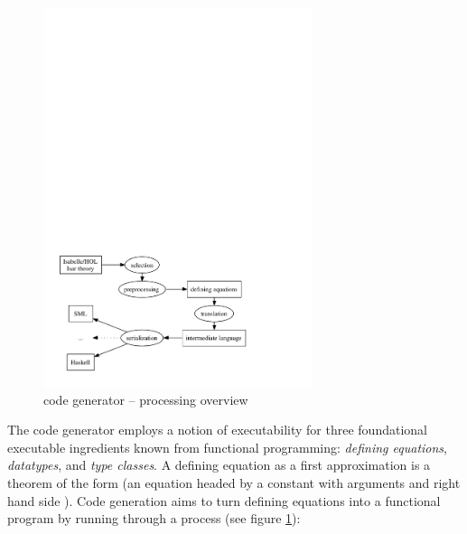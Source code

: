 \begin{isabellebody}
\begin{isamarkuptext}
\end{isamarkuptext}%
\isamarkuptrue%
%
\isamarkuptrue%
%
\begin{isamarkuptext}%
\begin{figure}[h]
  \centering
  \includegraphics[width=0.7\textwidth]{codegen_process}
  \caption{code generator -- processing overview}
  \label{fig:process}
  \end{figure}

  The code generator employs a notion of executability
  for three foundational executable ingredients known
  from functional programming:
  \emph{defining equations}, \emph{datatypes}, and
  \emph{type classes}. A defining equation as a first approximation
  is a theorem of the form 
  (an equation headed by a constant  with arguments
   and right hand side ).
  Code generation aims to turn defining equations
  into a functional program by running through
  a process (see figure \ref{fig:process}):

  \begin{itemize}


\end{itemize}
\end{isamarkuptext}
\end{isabellebody}
